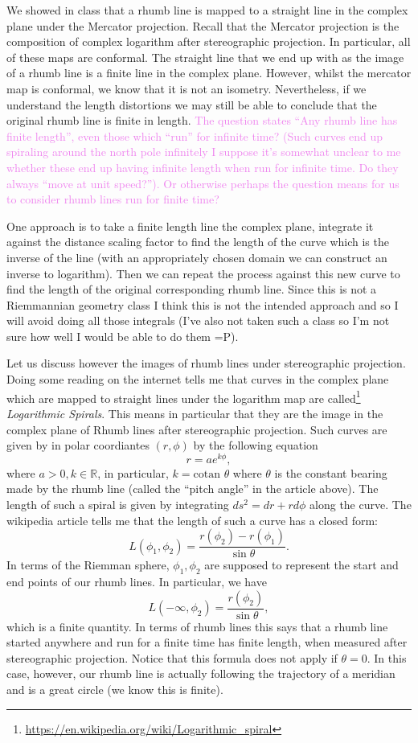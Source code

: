 \documentclass[12pt,letterpaper,boxed]{hmcpset}
\newcommand{\wg}[1]{\textcolor{violet}{#1}}
\newcommand{\R}{\mathbb R}
\begin{document}
\begin{solution}
We showed in class that a rhumb line is mapped to a straight line in
the complex plane under the Mercator projection. Recall that the
Mercator projection is the composition of complex logarithm after
stereographic projection. In particular, all of these maps are
conformal. The straight line that we end up with as the image of a
rhumb line is a finite line in the complex plane. However, whilst the
mercator map is conformal, we know that it is not an isometry.
Nevertheless, if we understand the length distortions we may still be
able to conclude that the original rhumb line is finite in length.
\wg{The question states
	``Any rhumb line has finite length'', even those which ``run'' for infinite time?}
\wg{(Such curves end up spiraling around the north pole infinitely
I suppose it's somewhat unclear to me whether these end up having
infinite length when run for infinite time. Do they always ``move at
unit speed?''). Or otherwise perhaps the question means for us to consider rhumb lines
run for finite time?}

One approach is to take a finite length line the complex plane,
integrate it against the distance scaling factor to find the length of the
curve which is the inverse of the line (with an appropriately chosen domain we can
construct an inverse to logarithm).
Then we can repeat the process against this
new curve to find the length of the original corresponding rhumb line. Since
this is not a Riemmannian geometry class I think this is not the
intended approach and so I will avoid doing all those integrals (I've
also not taken such a class so I'm not sure how well I would be able
to do them =P).

Let us discuss however the images of rhumb lines under stereographic projection.
Doing some reading on the internet tells me that curves in the complex
plane which are mapped to straight lines under the logarithm map are
called\footnote{\url{https://en.wikipedia.org/wiki/Logarithmic_spiral}}
\textit{Logarithmic Spirals}.
This means in particular that they are the image in the complex plane
of Rhumb lines after stereographic projection. 
Such curves are given by in polar coordiantes $(r, \phi)$ by the
following equation
\[
	r = a e^{k \phi},
\]
where $a > 0, k \in \R$, in particular, $k = \text{cotan }\theta$ where
$\theta$ is the constant bearing made by the rhumb line (called the
``pitch angle'' in the article above). 
The length of such a spiral is given by integrating $ds^2 = dr +
rd\phi$ along the curve. The wikipedia article tells me that the
length of such a curve has a closed form: 
\[
	L(\phi_1, \phi_2) = \frac{r(\phi_2) - r(\phi_1)}{\sin \theta}.
\]
In terms of the Riemman sphere, $\phi_1, \phi_2$ are supposed to
represent the start and end points of our rhumb lines. In particular,
we have 
\[
	L(-\infty, \phi_2) = \frac{r(\phi_2)}{\sin \theta},
\]
which is a finite quantity. In terms of rhumb lines this
says that a rhumb line started anywhere and run for a finite time has
finite length, when measured after stereographic projection. Notice that this formula
does not apply if $\theta = 0$. In this case, however, our rhumb line
is actually following the trajectory of a meridian and is a great
circle (we know this is finite).


\end{solution}
\end{document}
